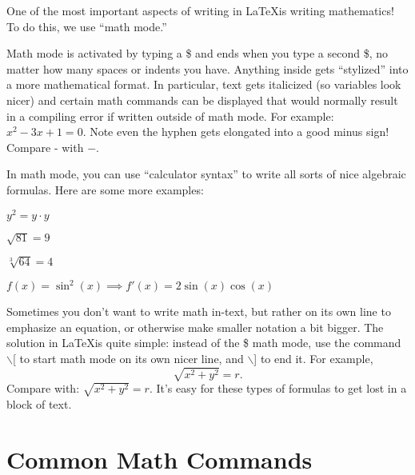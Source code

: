 \documentclass[12pt]{article}
\begin{document}
	One of the most important aspects of writing in \LaTeX is writing mathematics! To do this, we use ``math mode.'' %
	
	\bigskip
	
	Math mode is activated by typing a \$ and ends when you type a second \$, no matter how many spaces or indents you have. Anything inside gets ``stylized'' into a more mathematical format. In particular, text gets italicized (so variables look nicer) and certain math commands can be displayed that would normally result in a compiling error if written outside of math mode. For example: $x^2 - 3x + 1 = 0$. Note even the hyphen gets elongated into a good minus sign! Compare - with $-$. 
	
	\bigskip
	
	In math mode, you can use ``calculator syntax'' to write all sorts of nice algebraic formulas. Here are some more examples:
	
	\smallskip
	$y^2 = y \cdot y$ 
	
	\smallskip
	$\sqrt{81} = 9$
	
	\smallskip
	$\sqrt[3]{64} = 4$
	
	\smallskip
	$f(x) = \sin^2(x) \implies f'(x) = 2\sin(x)\cos(x)$
	
	\bigskip
	
	Sometimes you don't want to write math in-text, but rather on its own line to emphasize an equation, or otherwise make smaller notation a bit bigger. The solution in \LaTeX is quite simple: instead of the \$ math mode, use the command $\backslash$[ to start math mode on its own nicer line, and $\backslash$] to end it. For example,
	\[
		\sqrt{x^2+y^2} = r.
	\]
	Compare with: $\sqrt{x^2+y^2} = r$. It's easy for these types of formulas to get lost in a block of text.
	
	
	\section{Common Math Commands}
	
\end{document}
